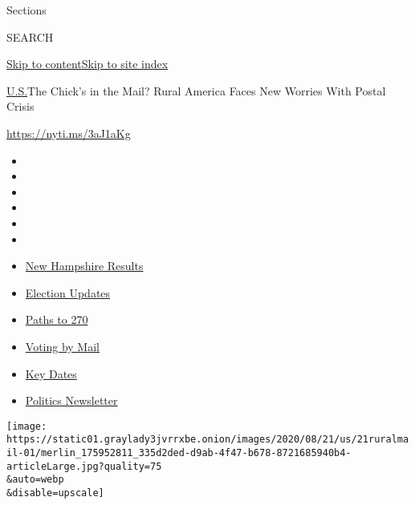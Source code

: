Sections

SEARCH

\protect\hyperlink{site-content}{Skip to
content}\protect\hyperlink{site-index}{Skip to site index}

\href{/section/us}{U.S.}\textbar{}The Chick's in the Mail? Rural America
Faces New Worries With Postal Crisis

\url{https://nyti.ms/3aJ1aKg}

\begin{itemize}
\item
\item
\item
\item
\item
\item
\end{itemize}

\begin{itemize}
\item
  \href{https://www.nytimes3xbfgragh.onion/interactive/2020/09/08/us/elections/results-new-hampshire-primary-elections.html?action=click\&pgtype=Article\&state=default\&region=TOP_BANNER\&context=storylines_menu}{New
  Hampshire Results}
\item
  \href{https://www.nytimes3xbfgragh.onion/live/2020/09/08/us/trump-vs-biden?action=click\&pgtype=Article\&state=default\&region=TOP_BANNER\&context=storylines_menu}{Election
  Updates}
\item
  \href{https://www.nytimes3xbfgragh.onion/interactive/2020/us/elections/election-states-biden-trump.html?action=click\&pgtype=Article\&state=default\&region=TOP_BANNER\&context=storylines_menu}{Paths
  to 270}
\item
  \href{https://www.nytimes3xbfgragh.onion/interactive/2020/08/31/us/politics/vote-by-mail-deadlines.html?action=click\&pgtype=Article\&state=default\&region=TOP_BANNER\&context=storylines_menu}{Voting
  by Mail}
\item
  \href{https://www.nytimes3xbfgragh.onion/interactive/2019/us/elections/2020-presidential-election-calendar.html?action=click\&pgtype=Article\&state=default\&region=TOP_BANNER\&context=storylines_menu}{Key
  Dates}
\item
  \href{https://www.nytimes3xbfgragh.onion/newsletters/politics?action=click\&pgtype=Article\&state=default\&region=TOP_BANNER\&context=storylines_menu}{Politics
  Newsletter}
\end{itemize}

\texttt{[image: https://static01.graylady3jvrrxbe.onion/images/2020/08/21/us/21ruralmail-01/merlin\_175952811\_335d2ded-d9ab-4f47-b678-8721685940b4-articleLarge.jpg?quality=75\\\&auto=webp\\\&disable=upscale]}

